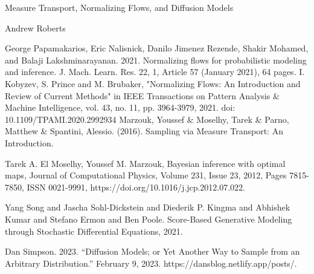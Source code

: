 \documentclass[12pt]{article}
\begin{document}
\begin{center}
\Large
Measure Transport, Normalizing Flows, and Diffusion Models 
\end{center}

\begin{flushright}
Andrew Roberts
\end{flushright} 


\begin{thebibliography}{20}
 George Papamakarios, Eric Nalisnick, Danilo Jimenez Rezende, Shakir Mohamed, and Balaji Lakshminarayanan. 2021. Normalizing flows for probabilistic modeling and inference. J. Mach. Learn. Res. 22, 1, Article 57 (January 2021), 64 pages.
 I. Kobyzev, S. Prince and M. Brubaker, "Normalizing Flows: An Introduction and Review of Current Methods" in IEEE Transactions on Pattern Analysis \& Machine Intelligence, vol. 43, no. 11, pp. 3964-3979, 2021. doi: 10.1109/TPAMI.2020.2992934
 Marzouk, Youssef \& Moselhy, Tarek \& Parno, Matthew \& Spantini, Alessio. (2016). Sampling via Measure Transport: An Introduction. 

 Tarek A. El Moselhy, Youssef M. Marzouk, Bayesian inference with optimal maps, Journal of Computational Physics, Volume 231, Issue 23, 2012, Pages 7815-7850, ISSN 0021-9991, https://doi.org/10.1016/j.jcp.2012.07.022.

 Yang Song and Jascha Sohl-Dickstein and Diederik P. Kingma and Abhishek Kumar and Stefano Ermon and Ben Poole. Score-Based Generative Modeling through Stochastic Differential Equations, 2021. 

 Dan Simpson. 2023. “Diffusion Models; or Yet Another Way to Sample from an Arbitrary Distribution.” February 9, 2023. https://dansblog.netlify.app/posts/.

\end{thebibliography}
\end{document}
